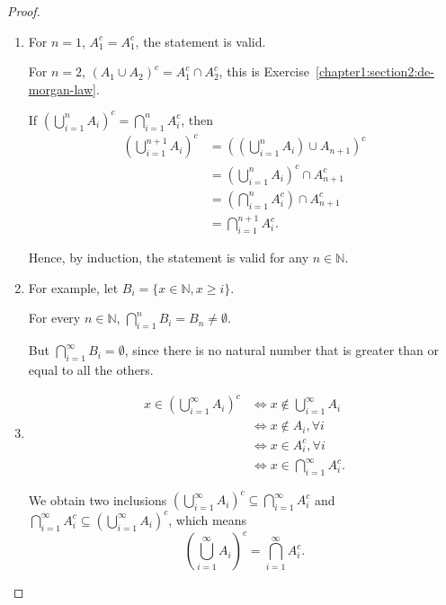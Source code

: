 \documentclass[class=understanding-analysis,crop=false]{standalone}
\begin{document}
\begin{proof}
    \begin{enumerate}[label = (\alph*)]
        \item For $n = 1$, $A_{1}^{c} = A_{1}^{c}$, the statement is valid.
              \par For $n = 2$, ${\left(A_{1}\cup A_{2}\right)}^{c} = A_{1}^{c}\cap A_{2}^{c}$, this is Exercise~\ref{chapter1:section2:de-morgan-law}.
              \par If ${\left(\bigcup^{n}_{i=1}A_{i}\right)}^{c} = \bigcap^{n}_{i=1}A_{i}^{c}$, then
              \begin{align*}
                  {\left(\bigcup^{n+1}_{i=1}A_{i}\right)}^{c} & = {\left(\left(\bigcup^{n}_{i=1}A_{i}\right)\cup A_{n+1}\right)}^{c} \\
                                                              & = {\left(\bigcup^{n}_{i=1}A_{i}\right)}^{c} \cap A_{n+1}^{c}         \\
                                                              & = {\left(\bigcap^{n}_{i=1}A_{i}^{c}\right)} \cap A_{n+1}^{c}         \\
                                                              & = \bigcap^{n+1}_{i=1}A_{i}^{c}.
              \end{align*}
              \par Hence, by induction, the statement is valid for any $n \in \mathbb{N}$.
        \item For example, let $B_{i} = \{ x \in \mathbb{N}, x \ge i \}$.
              \par For every $n \in \mathbb{N}$, $\bigcap^{n}_{i=1}B_{i} = B_{n} \ne \emptyset$.
              \par But $\bigcap^{\infty}_{i=1}B_{i} = \emptyset$, since there is no natural number that is greater than or equal to all the others.
        \item
              \begin{align*}
                  x \in {\left(\bigcup^{\infty}_{i=1}A_{i}\right)}^{c} & \Longleftrightarrow x \notin \bigcup^{\infty}_{i=1}A_{i}   \\
                                                                       & \Longleftrightarrow x \notin A_{i}, \forall i              \\
                                                                       & \Longleftrightarrow x \in A_{i}^{c}, \forall i             \\
                                                                       & \Longleftrightarrow x \in \bigcap^{\infty}_{i=1}A_{i}^{c}.
              \end{align*}
              \par We obtain two inclusions ${\left(\bigcup^{\infty}_{i=1}A_{i}\right)}^{c} \subseteq \bigcap^{\infty}_{i=1}A_{i}^{c}$ and $\bigcap^{\infty}_{i=1}A_{i}^{c} \subseteq {\left(\bigcup^{\infty}_{i=1}A_{i}\right)}^{c}$, which means
              \[
                  {\left(\bigcup^{\infty}_{i=1}A_{i}\right)}^{c} = \bigcap^{\infty}_{i=1}A_{i}^{c}.
              \]
    \end{enumerate}
\end{proof}
\end{document}
